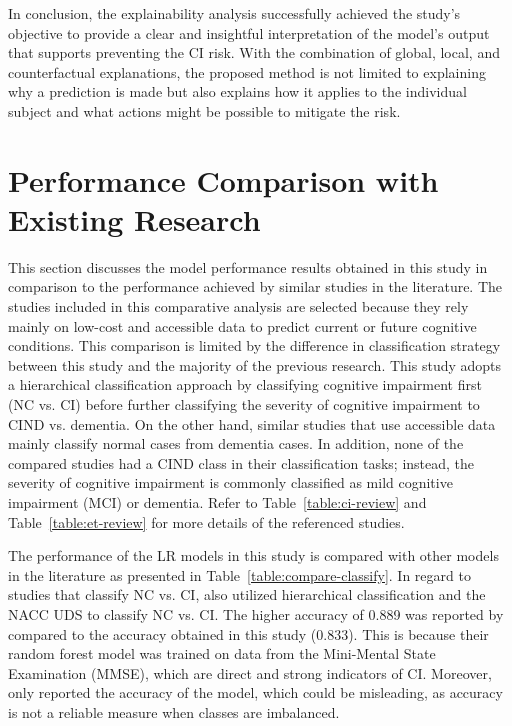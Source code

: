 In conclusion, the explainability analysis successfully achieved the study's objective to provide a clear and insightful interpretation of the model's output that supports preventing the CI risk. With the combination of global, local, and counterfactual explanations, the proposed method is not limited to explaining why a prediction is made but also explains how it applies to the individual subject and what actions might be possible to mitigate the risk.

\section{Performance Comparison with Existing Research}\label{sec:performance-comparison}
This section discusses the model performance results obtained in this study in comparison to the performance achieved by similar studies in the literature. The studies included in this comparative analysis are selected because they rely mainly on low-cost and accessible data to predict current or future cognitive conditions. This comparison is limited by the difference in classification strategy between this study and the majority of the previous research. This study adopts a hierarchical classification approach by classifying cognitive impairment first (NC vs. CI) before further classifying the severity of cognitive impairment to CIND vs. dementia. On the other hand, similar studies that use accessible data mainly classify normal cases from dementia cases. In addition, none of the compared studies had a CIND class in their classification tasks; instead, the severity of cognitive impairment is commonly classified as mild cognitive impairment (\acrshort{MCI}) or dementia. Refer to Table~\ref{table:ci-review} and Table~\ref{table:et-review} for more details of the referenced studies.

The performance of the LR models in this study is compared with other models in the literature as presented in Table~\ref{table:compare-classify}. In regard to studies that classify NC vs. CI,  also utilized hierarchical classification and the NACC UDS to classify NC vs. CI. The higher accuracy of 0.889 was reported by \cite{Ren2023Improving} compared to the accuracy obtained in this study (0.833). This is because their random forest model was trained on data from the Mini-Mental State Examination (\acrshort{MMSE}), which are direct and strong indicators of CI. Moreover,  only reported the accuracy of the model, which could be misleading, as accuracy is not a reliable measure when classes are imbalanced.

